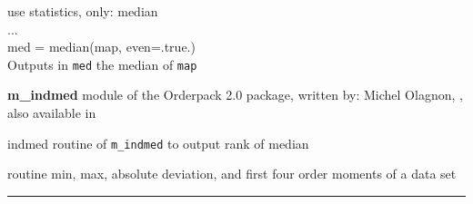 \begin{example}
{
use statistics, only: median \\
... \\
med = median(map, even=.true.)  \\
}
{
Outputs in {\tt med} the median of {\tt map}
}
\end{example}

\begin{modules}
  \begin{sulist}{} %
  \item[\textbf{m\_indmed}] module of the Orderpack 2.0 package, written by:
  Michel Olagnon,  ,
  also available in \htmladdnormallink{\modIndmed}{\srcurl\modIndmed}
  \item[indmed] routine of \texttt{m\_indmed} to output rank of median
  \end{sulist}
\end{modules}

\begin{related}
  \begin{sulist}{} %
  \item[\htmlref{compute\_statistics}{sub:compute_statistics}] routine min, max,
  absolute deviation, and first four order moments of a data set
  \end{sulist}
\end{related}

\rule{\hsize}{2mm}

\newpage
